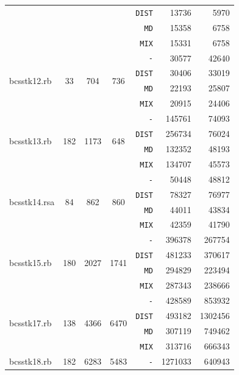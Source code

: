 \documentclass[11pt,american,czech,oneside]{book}
\theoremstyle{plain}
\theoremstyle{definition}
\begin{document}
{\begin{longtable}{|l|c|c|c|r|r|r|}
    & & & &\texttt{DIST} &	13736	&	5970	\\
    & & & &\texttt{MD}   &	15358	&	6758	\\
    & & & &\texttt{MIX}  &	15331	&	6758	\\
    \hline
  \multirow{4}{*}{bcsstk12.rb	}
    &	\multirow{4}{*}{33}	&	\multirow{4}{*}{704}	&	\multirow{4}{*}{736}	&\texttt{-}    &	30577	&	42640	\\
    & & & &\texttt{DIST} &	30406	&	33019	\\
    & & & &\texttt{MD}   &	22193	&	25807	\\
    & & & &\texttt{MIX}  &	20915	&	24406	\\
    \hline
  \multirow{4}{*}{bcsstk13.rb	}
    &	\multirow{4}{*}{182}	&	\multirow{4}{*}{1173}	&	\multirow{4}{*}{648}	&\texttt{-}    &	145761	&	74093	\\
    & & & &\texttt{DIST} &	256734	&	76024	\\
    & & & &\texttt{MD}   &	132352	&	48193	\\
    & & & &\texttt{MIX}  &	134707	&	45573	\\
    \hline
  \multirow{4}{*}{bcsstk14.rsa	}
    &	\multirow{4}{*}{84}	&	\multirow{4}{*}{862}	&	\multirow{4}{*}{860}	&\texttt{-}    &	50448	&	48812	\\
    & & & &\texttt{DIST} &	78327	&	76977	\\
    & & & &\texttt{MD}   &	44011	&	43834	\\
    & & & &\texttt{MIX}  &	42359	&	41790	\\
    \hline
  \multirow{4}{*}{bcsstk15.rb	}
    &	\multirow{4}{*}{180}	&	\multirow{4}{*}{2027}	&	\multirow{4}{*}{1741}	&\texttt{-}    &	396378	&	267754	\\
    & & & &\texttt{DIST} &	481233	&	370617	\\
    & & & &\texttt{MD}   &	294829	&	223494	\\
    & & & &\texttt{MIX}  &	287343	&	238666	\\
    \hline
  \multirow{4}{*}{bcsstk17.rb	}
    &	\multirow{4}{*}{138}	&	\multirow{4}{*}{4366}	&	\multirow{4}{*}{6470}	&\texttt{-}    &	428589	&	853932	\\
    & & & &\texttt{DIST} &	493182	&	1302456	\\
    & & & &\texttt{MD}   &	307119	&	749462	\\
    & & & &\texttt{MIX}  &	313716	&	666343	\\
    \hline
  \multirow{4}{*}{bcsstk18.rb	}
    &	\multirow{4}{*}{182}	&	\multirow{4}{*}{6283}	&	\multirow{4}{*}{5483}	&\texttt{-}    &	1271033	&	640943	\\

\end{longtable}}
\end{document}
